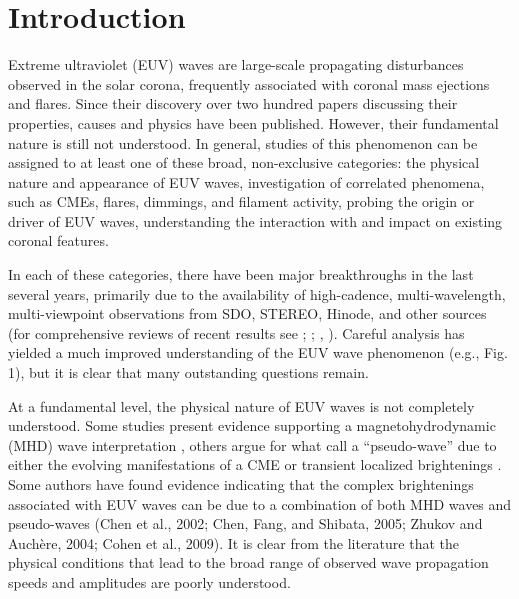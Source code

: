 \section{Introduction}\label{sec:Intro}

Extreme ultraviolet (EUV) waves are large-scale propagating
disturbances observed in the solar corona, frequently associated with
coronal mass ejections and flares.  Since their discovery \citep
{1997SoPh..175..571M, 1998GeoRL..25.2465T, 1999ApJ...517L.151T} over
two hundred papers discussing their properties, causes and physics
have been published.  However, their fundamental nature is still not
understood. In general, studies of this phenomenon can be assigned to
at least one of these broad, non-exclusive categories: the physical
nature and appearance of EUV waves, investigation of correlated
phenomena, such as CMEs, flares, dimmings, and filament activity,
probing the origin or driver of EUV waves, understanding the
interaction with and impact on existing coronal features.

In each of these categories, there have been major breakthroughs in
the last several years, primarily due to the availability of
high-cadence, multi-wavelength, multi-viewpoint observations from SDO,
STEREO, Hinode, and other sources (for comprehensive reviews of recent
results see \cite{2011SSRv..158..365G}; \cite{2011JASTP..73.1096Z};
\cite{2011A&A...532A.151W}, \cite{2012SoPh..281..187P}).  Careful
analysis has yielded a much improved understanding of the EUV wave
phenomenon (e.g., Fig. 1), but it is clear that many outstanding
questions remain.

At a fundamental level, the physical nature of EUV waves is not
completely understood. Some studies present evidence supporting a
magnetohydrodynamic (MHD) wave interpretation
\citep{1998GeoRL..25.2465T, 1999ApJ...517L.151T,2000ApJ...543L..89W,
  2001JGR...10625089W, 2002ApJ...574..440O, 2010ApJ...713.1008S},
others argue for what \cite{2012SoPh..281..187P} call a “pseudo-wave”
due to either the evolving manifestations of a CME
\citep{1999SoPh..190..107D, 2000ApJ...545..512D, 2008SoPh..247..123D,
  2011ApJ...738..167S} or transient localized brightenings
\citep{2007AN....328..760A, 2007ApJ...656L.101A,}.  Some authors have
found evidence indicating that the complex brightenings associated
with EUV waves can be due to a combination of both MHD waves and
pseudo-waves (Chen et al., 2002; Chen, Fang, and Shibata, 2005; Zhukov
and Auchère, 2004; Cohen et al., 2009).  It is clear from the
literature that the physical conditions that lead to the broad range
of observed wave propagation speeds \citep{2011A&A...532A.151W} and
amplitudes are poorly understood.

